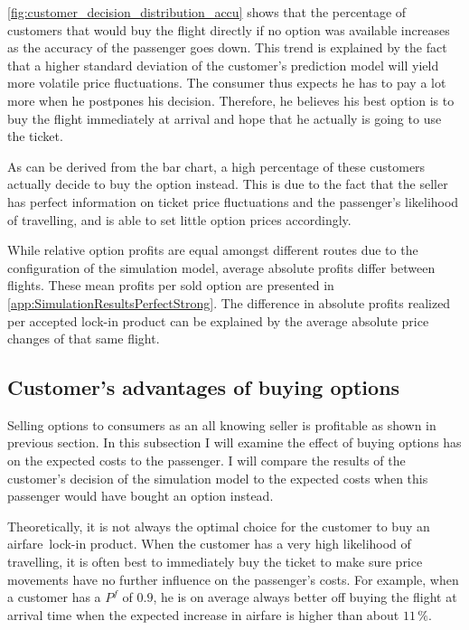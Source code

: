 \autoref{fig:customer_decision_distribution_accu} shows that the percentage of customers that would buy the flight directly if no option was available increases as the accuracy of the passenger goes down. This trend is explained by the fact that a higher standard deviation of the customer's prediction model will yield more volatile price fluctuations. The consumer thus expects he has to pay a lot more when he postpones his decision. Therefore, he believes his best option is to buy the flight immediately at arrival and hope that he actually is going to use the ticket.

As can be derived from the bar chart, a high percentage of these customers actually decide to buy the option instead. This is due to the fact that the seller has perfect information on ticket price fluctuations and the passenger's likelihood of travelling, and is able to set little option prices accordingly.


While relative option profits are equal amongst different routes due to the configuration of the simulation model, average absolute profits differ between flights. These mean profits per sold option are presented in \autoref{app:SimulationResultsPerfectStrong}. The difference in absolute profits realized per accepted lock-in product can be explained by the average absolute price changes of that same flight.


\subsection{Customer's advantages of buying options}
Selling options to consumers as an all knowing seller is profitable as shown in previous section. In this subsection I will examine the effect of buying options has on the expected costs to the passenger. I will compare the results of the customer's decision of the simulation model to the expected costs when this passenger would have bought an option instead.

Theoretically, it is not always the optimal choice for the customer to buy an airfare~lock-in product. When the customer has a very high likelihood of travelling, it is often best to immediately buy the ticket to make sure price movements have no further influence on the passenger's costs. For example, when a customer has a $P^f$ of $0.9$, he is on average always better off buying the flight at arrival time when the expected increase in airfare is higher than about $11\,\%$.

